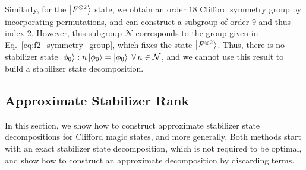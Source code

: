 Similarly, for the $\ket{F^{\otimes 2}}$ state, we obtain an order $18$ Clifford symmetry group by incorporating permutations, and can construct a subgroup of order $9$ and thus index $2$. However, this subgroup $\mathcal{N}$ corresponds to the group given in Eq.~\ref{eq:f2_symmetry_group}, which fixes the state $\ket{F^{\otimes 2}}$. Thus, there is no stabilizer state $\ket{\phi_{0}}:n\ket{\phi_{0}}=\ket{\phi_{0}}\;\forall\,n\in\mathcal{N}$, and we cannot use this result to build a stabilizer state decomposition.
\subsection{Approximate Stabilizer Rank}\label{sec:approx_results}
In this section, we show how to construct approximate stabilizer state decompositions for Clifford magic states, and more generally. Both methods start with an exact stabilizer state decomposition, which is not required to be optimal, and show how to construct an approximate decomposition by discarding terms.
